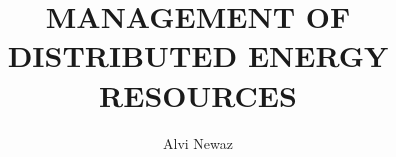 \documentclass[11pt,expanded,copyright]{fsuthesis}
\title{MANAGEMENT OF DISTRIBUTED ENERGY RESOURCES}
\author{Alvi Newaz}
\begin{document}
\frontmatter
\maketitle
\makecommitteepage



\tableofcontents
\listoftables
\listoffigures


\end{document}
